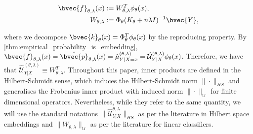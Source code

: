 \documentclass{article}
\begin{document}
		\begin{equation}
			\begin{aligned}
				\bvec{f}_{\theta, \lambda}(x) &:= W_{\theta, \lambda}^{T} \phi_{\theta}(x), \\
				W_{\theta, \lambda} &:= \Phi_{\theta} (K_{\theta} + n \lambda I)^{-1} \bvec{Y},
			\end{aligned}
		\label{eq:linear_predictor}
		\end{equation}
		
		where we decompose $\bvec{k}_{\theta}(x) = \Phi_{\theta}^{T} \phi_{\theta}(x)$ by the reproducing property. By \cref{thm:empirical_probability_is_embedding}, $\bvec{f}_{\theta, \lambda}(x) = \hat{\bvec{p}}_{\theta, \lambda}(x) = \hat{\mu}^{(\theta, \lambda)}_{Y | X = x} = \hat{\mathcal{U}}^{(\theta, \lambda)}_{Y | X} \phi_{\theta}(x)$. Therefore, we have that $\hat{\mathcal{U}}^{(\theta, \lambda)}_{Y | X} \equiv W_{\theta, \lambda}^{T}$. Throughout this paper, inner products are defined in the Hilbert-Schmidt sense, which induces the Hilbert-Schmidt norm $\| \cdot \|_{HS}$ and generalises the Frobenius inner product with induced norm $\| \cdot \|_{\mathrm{tr}}$ for finite dimensional operators. Nevertheless, while they refer to the same quantity, we will use the standard notations $ \| \hat{\mathcal{U}}^{\theta, \lambda}_{Y | X} \|_{HS}$ as per the literature in Hilbert space embeddings and $\| W_{\theta, \lambda} \|_{\mathrm{tr}}$ as per the literature for linear classifiers.
\end{document}
